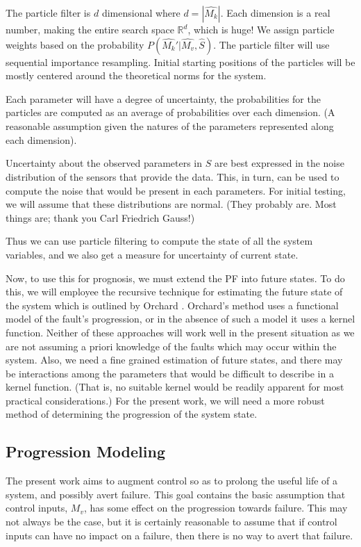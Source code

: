 \documentclass[12pt]{article}
\begin{document}
The particle filter is $d$ dimensional where $d=|\hat{M_k}|$.  Each
dimension is a real number, making the entire search space
$\mathbb{R}^d$, which is huge!  We assign particle weights based on
the probability $P(\hat{M_k}'|\hat{M_v}, \hat{S})$.  The particle
filter will use sequential importance resampling. Initial starting
positions of the particles will be mostly centered around the
theoretical norms for the system.

Each parameter will have a degree of uncertainty, the probabilities
for the particles are computed as an average of probabilities over
each dimension.  (A reasonable assumption given the natures of the
parameters represented along each dimension).

Uncertainty about the observed parameters in $\hat{S}$ are best
expressed in the noise distribution of the sensors that provide the
data.  This, in turn, can be used to compute the noise that would be
present in each parameters.  For initial testing, we will assume that
these distributions are normal.  (They probably are.  Most things
are; thank you Carl Friedrich Gauss!)

Thus we can use particle filtering to compute the state of all the
system variables, and we also get a measure for uncertainty of current
state.

Now, to use this for prognosis, we must extend the PF into future
states.  To do this, we will employee the recursive technique for
estimating the future state of the system which is outlined by Orchard
\cite{orchard}. Orchard's method uses a functional model of the
fault's progression, or in the absence of such a model it uses a
kernel function.  Neither of these approaches will work well in the
present situation as we are not assuming a priori knowledge of the
faults which may occur within the system.  Also, we need a fine
grained estimation of future states, and there may be interactions
among the parameters that would be difficult to describe in a kernel
function. (That is, no suitable kernel would be readily apparent for
most practical considerations.)  For the present work, we will need a
more robust method of determining the progression of the system state.

\subsection{Progression Modeling}
The present work aims to augment control so as to prolong the useful
life of a system, and possibly avert failure.  This goal contains the
basic assumption that control inputs, $M_v$, has some effect on the
progression towards failure.  This may not always be the case, but it
is certainly reasonable to assume that if control inputs can have no
impact on a failure, then there is no way to avert that failure.
\end{document}
